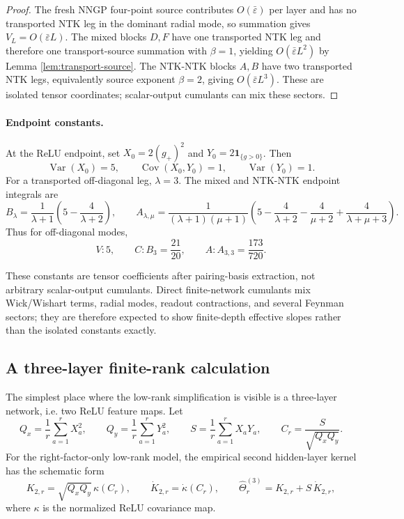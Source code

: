 \documentclass{article}
\newcommand{\Cov}{\operatorname{Cov}}
\newcommand{\Var}{\operatorname{Var}}
\newcommand{\wh}{\widehat}
\newcommand{\barE}{\bar\varepsilon}
\newcommand{\one}{\mathbf 1}
\begin{document}
\begin{proof}
The fresh NNGP four-point source contributes \(O(\barE)\) per layer and has no transported NTK leg in the dominant radial mode, so summation gives \(V_L=O(\barE L)\). The mixed blocks \(D,F\) have one transported NTK leg and therefore one transport-source summation with \(\beta=1\), yielding \(O(\barE L^2)\) by Lemma \ref{lem:transport-source}. The NTK-NTK blocks \(A,B\) have two transported NTK legs, equivalently source exponent \(\beta=2\), giving \(O(\barE L^3)\). These are isolated tensor coordinates; scalar-output cumulants can mix these sectors.
\end{proof}

\paragraph{Endpoint constants.}
At the ReLU endpoint, set \(X_0=2(g_+)^2\) and \(Y_0=2\one_{\{g>0\}}\). Then
\begin{equation}
\Var(X_0)=5,
\qquad
\Cov(X_0,Y_0)=1,
\qquad
\Var(Y_0)=1.
\end{equation}
For a transported off-diagonal leg, \(\lambda=3\). The mixed and NTK-NTK endpoint integrals are
\begin{equation}
B_\lambda=\frac1{\lambda+1}\left(5-\frac4{\lambda+2}\right),
\qquad
A_{\lambda,\mu}=\frac{1}{(\lambda+1)(\mu+1)}\left(5-\frac4{\lambda+2}-\frac4{\mu+2}+\frac4{\lambda+\mu+3}\right).
\end{equation}
Thus for off-diagonal modes,
\begin{equation}
V: 5,
\qquad
C: B_3=\frac{21}{20},
\qquad
A: A_{3,3}=\frac{173}{720}.
\label{eq:endpoint-constants}
\end{equation}

These constants are tensor coefficients after pairing-basis extraction, not arbitrary scalar-output cumulants. Direct finite-network cumulants mix Wick/Wishart terms, radial modes, readout contractions, and several Feynman sectors; they are therefore expected to show finite-depth effective slopes rather than the isolated constants exactly.

\subsection{A three-layer finite-rank calculation}
The simplest place where the low-rank simplification is visible is a three-layer network, i.e. two ReLU feature maps. Let
\[
Q_x=\frac1r\sum_{a=1}^{r}X_a^2,\qquad
Q_y=\frac1r\sum_{a=1}^{r}Y_a^2,\qquad
S=\frac1r\sum_{a=1}^{r}X_aY_a,
\qquad
C_r=\frac{S}{\sqrt{Q_xQ_y}}.
\]
For the right-factor-only low-rank model, the empirical second hidden-layer kernel has the schematic form
\[
K_{2,r}=\sqrt{Q_xQ_y}\,\kappa(C_r),
\qquad
\dot K_{2,r}=\dot\kappa(C_r),
\qquad
\wh\Theta^{(3)}_r=K_{2,r}+S\,\dot K_{2,r},
\]
where \(\kappa\) is the normalized ReLU covariance map.
\end{document}
